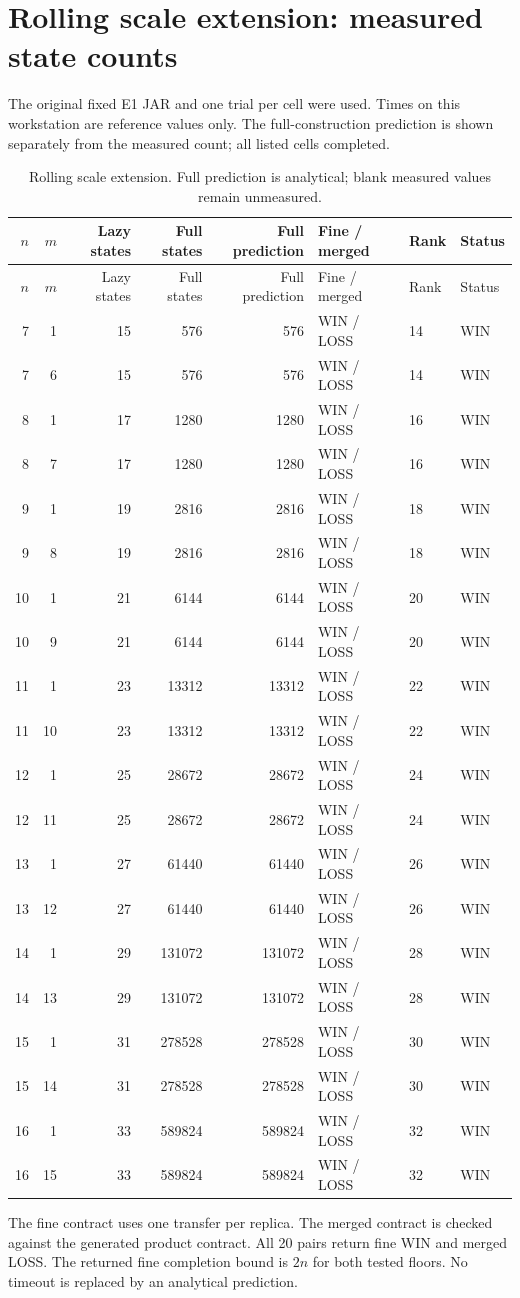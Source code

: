 \documentclass[10pt]{article}
\begin{document}
\section*{Rolling scale extension: measured state counts}
The original fixed E1 JAR and one trial per cell were used. Times on this workstation are reference values only. The full-construction prediction is shown separately from the measured count; all listed cells completed.
\small
\begin{longtable}{rrrrrlll}
\caption{Rolling scale extension. Full prediction is analytical; blank measured values remain unmeasured.}\\
\toprule
$n$ & $m$ & Lazy states & Full states & Full prediction & Fine / merged & Rank & Status \\
\midrule
\endfirsthead
\toprule
$n$ & $m$ & Lazy states & Full states & Full prediction & Fine / merged & Rank & Status \\
\midrule
\endhead
7 & 1 & 15 & 576 & 576 & WIN / LOSS & 14 & WIN \\
7 & 6 & 15 & 576 & 576 & WIN / LOSS & 14 & WIN \\
8 & 1 & 17 & 1280 & 1280 & WIN / LOSS & 16 & WIN \\
8 & 7 & 17 & 1280 & 1280 & WIN / LOSS & 16 & WIN \\
9 & 1 & 19 & 2816 & 2816 & WIN / LOSS & 18 & WIN \\
9 & 8 & 19 & 2816 & 2816 & WIN / LOSS & 18 & WIN \\
10 & 1 & 21 & 6144 & 6144 & WIN / LOSS & 20 & WIN \\
10 & 9 & 21 & 6144 & 6144 & WIN / LOSS & 20 & WIN \\
11 & 1 & 23 & 13312 & 13312 & WIN / LOSS & 22 & WIN \\
11 & 10 & 23 & 13312 & 13312 & WIN / LOSS & 22 & WIN \\
12 & 1 & 25 & 28672 & 28672 & WIN / LOSS & 24 & WIN \\
12 & 11 & 25 & 28672 & 28672 & WIN / LOSS & 24 & WIN \\
13 & 1 & 27 & 61440 & 61440 & WIN / LOSS & 26 & WIN \\
13 & 12 & 27 & 61440 & 61440 & WIN / LOSS & 26 & WIN \\
14 & 1 & 29 & 131072 & 131072 & WIN / LOSS & 28 & WIN \\
14 & 13 & 29 & 131072 & 131072 & WIN / LOSS & 28 & WIN \\
15 & 1 & 31 & 278528 & 278528 & WIN / LOSS & 30 & WIN \\
15 & 14 & 31 & 278528 & 278528 & WIN / LOSS & 30 & WIN \\
16 & 1 & 33 & 589824 & 589824 & WIN / LOSS & 32 & WIN \\
16 & 15 & 33 & 589824 & 589824 & WIN / LOSS & 32 & WIN \\
\bottomrule
\end{longtable}

The fine contract uses one transfer per replica. The merged contract is checked against the generated product contract. All 20 pairs return fine WIN and merged LOSS. The returned fine completion bound is $2n$ for both tested floors. No timeout is replaced by an analytical prediction.
\end{document}
